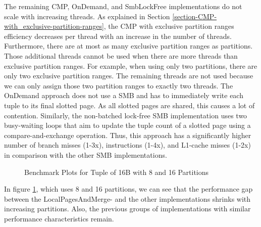 The remaining \ac{CMP}, OnDemand, and SmbLockFree implementations do not scale with increasing threads.
As explained in Section \ref{section-CMP-with_exclusive-partition-ranges}, the \ac{CMP} with exclusive partition ranges efficiency decreases per thread with an increase in the number of threads.
Furthermore, there are at most as many exclusive partition ranges as partitions.
Those additional threads cannot be used when there are more threads than exclusive partition ranges.
For example, when using only two partitions, there are only two exclusive partition ranges.
The remaining threads are not used because we can only assign those two partition ranges to exactly two threads.
The OnDemand approach does not use a \ac{SMB} and has to immediately write each tuple to its final slotted page.
As all slotted pages are shared, this causes a lot of contention.
Similarly, the non-batched lock-free \ac{SMB} implementation uses two busy-waiting loops that aim to update the tuple count of a slotted page using a compare-and-exchange operation.
Thus, this approach has a significantly higher number of branch misses (1-3x), instructions (1-4x), and L1-cache misses (1-2x) in comparison with the other \ac{SMB} implementations.
\begin{figure}[h]
  \centering
  \begin{subfigure}{.49\textwidth}
    \centering
    \resizebox{\linewidth}{!}{}
  \end{subfigure}
  \begin{subfigure}{.49\textwidth}
    \centering
    \resizebox{\linewidth}{!}{}
  \end{subfigure}
  \begin{subfigure}{\textwidth}
    \centering
    \resizebox{\linewidth}{!}{}
  \end{subfigure}
  \caption[Shuffle Benchmark Plots for Tuple of 16B with 8 and 16 Partitions]{Benchmark Plots for Tuple of 16B with 8 and 16 Partitions}
  \label{plot-shuffle-16B-8-16}
\end{figure}

In figure \ref{plot-shuffle-16B-8-16}, which uses 8 and 16 partitions, we can see that the performance gap between the LocalPagesAndMerge- and the other implementations shrinks with increasing partitions.
Also, the previous groups of implementations with similar performance characteristics remain.

